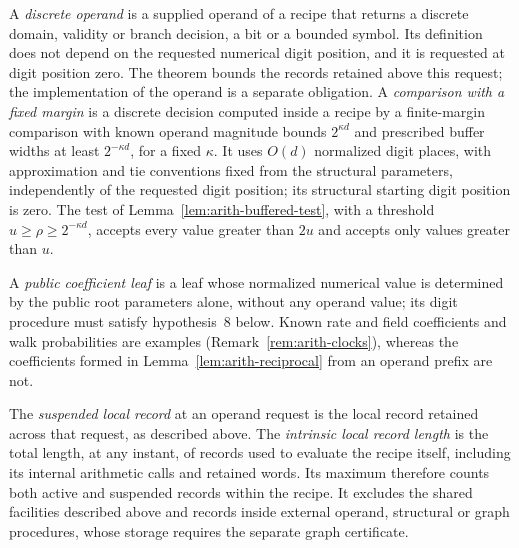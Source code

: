 A \emph{discrete operand} is a supplied operand of a recipe that returns
a discrete domain, validity or branch decision, a bit or a bounded
symbol.  Its definition does not depend on the requested numerical
digit position, and it is requested at digit position zero.  The theorem bounds the
records retained above this request; the implementation of the operand
is a separate obligation.
A \emph{comparison with a fixed margin} is a discrete decision computed inside a recipe
by a finite-margin comparison with known operand magnitude bounds
$2^{\kappa d}$ and prescribed buffer widths at least $2^{-\kappa d}$,
for a fixed $\kappa$.  It uses $O(d)$ normalized digit places, with
approximation and tie conventions fixed from the structural parameters,
independently of the requested digit position; its structural starting
digit position is zero.  The test of Lemma~\ref{lem:arith-buffered-test}, with a
threshold $u\ge\rho\ge2^{-\kappa d}$, accepts every value greater than
$2u$ and accepts only values greater than $u$.

A \emph{public coefficient leaf} is a leaf whose normalized numerical
value is determined by the public root parameters alone, without any
operand value; its digit procedure must satisfy hypothesis~8 below.
Known rate and field coefficients and walk probabilities are examples
(Remark~\ref{rem:arith-clocks}), whereas the coefficients formed in
Lemma~\ref{lem:arith-reciprocal} from an operand prefix are not.

The \emph{suspended local record} at an operand request is the local
record retained across that request, as described above.  The
\emph{intrinsic local record length} is the total length, at any instant,
of records used to evaluate the recipe itself, including its internal
arithmetic calls and retained words.  Its maximum therefore counts both
active and suspended records within the recipe.  It excludes the shared
facilities described above and records inside external operand,
structural or graph procedures, whose storage requires the separate
graph certificate.


